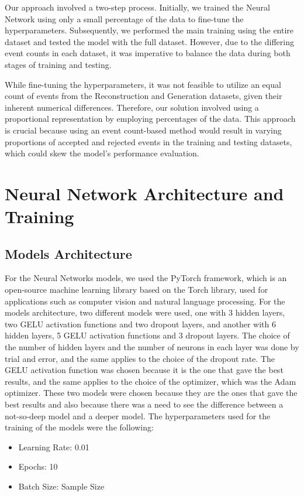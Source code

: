 \documentclass[EPJ,twocolumn]{webofc}
\begin{document}
Our approach involved a two-step process. Initially, we trained the Neural Network using only a small percentage of the data to fine-tune the hyperparameters. Subsequently, we performed the main training using the entire dataset and tested the model with the full dataset. However, due to the differing event counts in each dataset, it was imperative to balance the data during both stages of training and testing.

While fine-tuning the hyperparameters, it was not feasible to utilize an equal count of events from the Reconstruction and Generation datasets, given their inherent numerical differences. Therefore, our solution involved using a proportional representation by employing percentages of the data. This approach is crucial because using an event count-based method would result in varying proportions of accepted and rejected events in the training and testing datasets, which could skew the model's performance evaluation.


\section{Neural Network Architecture and Training}

\subsection{Models Architecture}

For the Neural Networks models, we used the PyTorch framework, which is an open-source machine learning library based on the Torch library, used for applications such as computer vision and natural language processing.
For the models architecture, two different models were used, one with 3 hidden layers, two GELU activation functions and two dropout layers, and another with 6 hidden layers, 5 GELU activation functions and 3 dropout layers.
The choice of the number of hidden layers and the number of neurons in each layer was done by trial and error, and the same applies to the choice of the dropout rate. 
The GELU activation function was chosen because it is the one that gave the best results, and the same applies to the choice of the optimizer, which was the Adam optimizer.
These two models were chosen because they are the ones that gave the best results and also because there was a need to see the difference between a not-so-deep model and a deeper model.
The hyperparameters used for the training of the models were the following:
\begin{itemize}
    \item Learning Rate: 0.01
    \item Epochs: 10
    \item Batch Size: Sample Size
\end{itemize}
\end{document}
